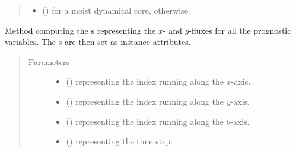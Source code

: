 \documentclass[letterpaper,10pt,english]{sphinxmanual}
\begin{document}
\begin{fulllineitems}
\begin{fulllineitems}
\begin{quote}
\begin{description}
\begin{itemize}
\item {} 
 () \textendash{}  for a moist dynamical core,  otherwise.

\end{itemize}

\end{description}\end{quote}

\end{fulllineitems}


\begin{fulllineitems}
\label{\detokenize{api:tasmania.dycore.flux_isentropic_nonconservative_centered.FluxIsentropicNonconservativeCentered._compute_horizontal_fluxes}}
Method computing the s representing the \(x\)- and \(y\)-fluxes for
all the prognostic variables. The s are then set as instance attributes.
\begin{quote}\begin{description}
\item[{Parameters}] \leavevmode\begin{itemize}
\item {} 
 () \textendash{}  representing the index running along the \(x\)-axis.

\item {} 
 () \textendash{}  representing the index running along the \(y\)-axis.

\item {} 
 () \textendash{}  representing the index running along the \(\theta\)-axis.

\item {} 
 () \textendash{}  representing the time step.


\end{itemize}
\end{description}
\end{quote}
\end{fulllineitems}
\end{fulllineitems}
\end{document}

